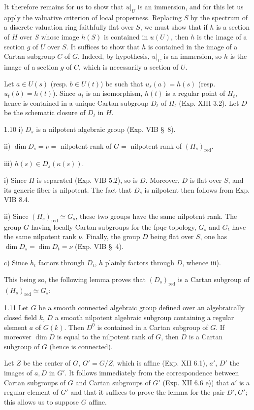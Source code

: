 It therefore remains for us to show that $u|_U$ is an immersion, and for this let us apply the valuative criterion of local properness. Replacing $S$ by the spectrum of a discrete valuation ring faithfully flat over $S$, we must show that if $h$ is a section of $H$ over $S$ whose image $h(S)$ is contained in $u(U)$, then $h$ is the image of a section $g$ of $U$ over $S$. It suffices to show that $h$ is contained in the image of a Cartan subgroup $C$ of $G$. Indeed, by hypothesis, $u|_C$ is an immersion, so $h$ is the image of a section $g$ of $C$, which is necessarily a section of $U$.

Let $a\in U(s)$ (resp. $b\in U(t)$) be such that $u_s(a)=h(s)$ (resp. $u_t(b)=h(t)$). Since $u_t$ is an isomorphism, $h(t)$ is a regular point of $H_t$, hence is contained in a unique Cartan subgroup $D_t$ of $H_t$ (Exp. XIII 3.2). Let $D$ be the schematic closure of $D_t$ in $H$.
\begin{lemma}{1.10}\label{XVI.1.10}
\noindent i) $D_s$ is a nilpotent algebraic group (Exp. VIB \S\ 8).

\noindent ii) $\dim D_s=\nu=$ nilpotent rank of $G=$ nilpotent rank of $(H_s)_{\mathrm{red}}$.

\noindent iii) $h(s)\in D_s(\kappa(s))$.
\end{lemma}
i) Since $H$ is separated (Exp. VIB 5.2), so is $D$. Moreover, $D$ is flat over $S$, and its generic fiber is nilpotent. The fact that $D_s$ is nilpotent then follows from Exp. VIB 8.4.

ii) Since $(H_s)_{\mathrm{red}}\simeq G_s$, these two groups have the same nilpotent rank. The group $G$ having locally Cartan subgroups for the fpqc topology, $G_s$ and $G_t$ have the same nilpotent rank $\nu$. Finally, the group $D$ being flat over $S$, one has $\dim D_s=\dim D_t=\nu$ (Exp. VIB \S\ 4).

c) Since $h_t$ factors through $D_t$, $h$ plainly factors through $D$, whence iii).

This being so, the following lemma proves that $(D_s)_{\mathrm{red}}$ is a Cartan subgroup of $(H_s)_{\mathrm{red}}\simeq G_s$:
\begin{lemma}{1.11}\label{XVI.1.11}
Let $G$ be a smooth connected algebraic group defined over an algebraically closed field $k$, $D$ a smooth nilpotent algebraic subgroup containing a regular element $a$ of $G(k)$. Then $D^0$ is contained in a Cartan subgroup of $G$. If moreover $\dim D$ is equal to the nilpotent rank of $G$, then $D$ is a Cartan subgroup of $G$ (hence is connected).
\end{lemma}
Let $Z$ be the center of $G$, $G'=G/Z$, which is affine (Exp. XII 6.1), $a'$, $D'$ the images of $a,D$ in $G'$. It follows immediately from the correspondence between Cartan subgroups of $G$ and Cartan subgroups of $G'$ (Exp. XII 6.6 e)) that $a'$ is a regular element of $G'$ and that it suffices to prove the lemma for the pair $D',G'$; this allows us to suppose $G$ affine.

